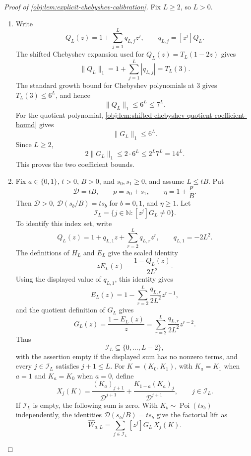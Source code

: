 \documentclass[11pt]{article}
\begin{document}
\begin{proof}[Proof of \cref{obj:lem:explicit-chebyshev-calibration}]
Fix \(L\ge2\), so \(L>0\).
\begin{enumerate}
\item Write
\[
Q_L(z)=1+\sum_{j=1}^L q_{L,j}z^j,
\qquad q_{L,j}=[z^j]Q_L .
\]
The shifted Chebyshev expansion used for \(Q_L(z)=T_L(1-2z)\) gives
\[
\|Q_L\|_1
 =1+\sum_{j=1}^L |q_{L,j}|
 =T_L(3).
\]
The standard growth bound for Chebyshev polynomials at \(3\) gives \(T_L(3)\le 6^L\), and hence
\[
\|Q_L\|_1\le 6^L\le 7^L .
\]
For the quotient polynomial, \cref{obj:lem:shifted-chebyshev-quotient-coefficient-bound} gives
\[
\|G_L\|_1\le 6^L .
\]
Since \(L\ge2\),
\[
2\|G_L\|_1
 \le 2\cdot 6^L
 \le 2^L7^L
 =14^L .
\]
This proves the two coefficient bounds. %

\item Fix \(a\in\{0,1\}\), \(t>0\), \(B>0\), and \(s_0,s_1\ge0\), and assume \(L\le tB\). Put
\[
\mathscr D=tB,\qquad p=s_0+s_1,\qquad \eta=1+\frac pB .
\]
Then \(\mathscr D>0\), \(\mathscr D(s_b/B)=ts_b\) for \(b=0,1\), and \(\eta\ge1\). Let
\[
\mathscr I_L=\{j\in\mathbb N:[z^j]G_L\ne0\}.
\]
To identify this index set, write
\[
Q_L(z)=1+q_{L,1}z+\sum_{r=2}^L q_{L,r}z^r,
\qquad q_{L,1}=-2L^2.
\]
The definitions of \(H_L\) and \(E_L\) give the scaled identity
\[
zE_L(z)=\frac{1-Q_L(z)}{2L^2}.
\]
Using the displayed value of \(q_{L,1}\), this identity gives
\[
E_L(z)=1-\sum_{r=2}^L\frac{q_{L,r}}{2L^2}z^{r-1},
\]
and the quotient definition of \(G_L\) gives
\[
G_L(z)=\frac{1-E_L(z)}z
=\sum_{r=2}^L\frac{q_{L,r}}{2L^2}z^{r-2}.
\]
Thus
\[
\mathscr I_L\subseteq\{0,\ldots,L-2\},
\]
with the assertion empty if the displayed sum has no nonzero terms, and every \(j\in\mathscr I_L\) satisfies \(j+1\le L\). For \(K=(K_0,K_1)\), with \(K_a=K_1\) when \(a=1\) and \(K_a=K_0\) when \(a=0\), define
\[
X_j(K)
=
\frac{(K_a)_{j+1}}{\mathscr D^{j+1}}
+
\frac{K_{1-a}(K_a)_j}{\mathscr D^{j+1}},
\qquad j\in\mathscr I_L .
\]
If \(\mathscr I_L\) is empty, the following sum is zero. With \(K_b\sim\operatorname{Poi}(ts_b)\) independently, the identities \(\mathscr D(s_b/B)=ts_b\) give the factorial lift as
\[
\widehat W_{a,L}
=
\sum_{j\in\mathscr I_L} [z^j]G_L\,X_j(K).
\]


\end{enumerate}
\end{proof}
\end{document}
